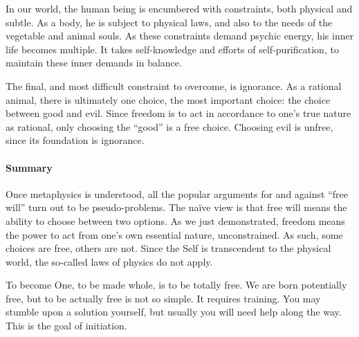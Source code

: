 In our world, the human being is encumbered with constraints, both physical and subtle. As a body, he is subject to physical laws, and also to the needs of the vegetable and animal souls. As these constraints demand psychic energy, his inner life becomes multiple. It takes self-knowledge and efforts of self-purification, to maintain these inner demands in balance.

The final, and most difficult constraint to overcome, is ignorance. As a rational animal, there is ultimately one choice, the most important choice: the choice between good and evil. Since freedom is to act in accordance to one's true nature as rational, only choosing the “good” is a free choice. Choosing evil is unfree, since its foundation is ignorance.

\paragraph{Summary}
Once metaphysics is understood, all the popular arguments for and against “free will” turn out to be pseudo-problems. The naïve view is that free will means the ability to choose between two options. As we just demonstrated, freedom means the power to act from one's own essential nature, unconstrained. As such, some choices are free, others are not. Since the Self is transcendent to the physical world, the so-called laws of physics do not apply.

To become One, to be made whole, is to be totally free. We are born potentially free, but to be actually free is not so simple. It requires training. You may stumble upon a solution yourself, but usually you will need help along the way. This is the goal of initiation.

